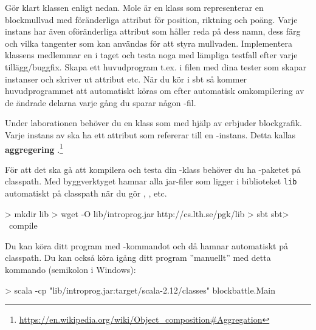 \Subtask Gör klart klassen  enligt nedan. Mole är en klass som representerar en blockmullvad med föränderliga attribut för position, riktning och poäng. Varje instans har även oföränderliga attribut som håller reda på dess namn, dess färg och vilka tangenter som kan användas för att styra mullvaden. Implementera klassens medlemmar en i taget och testa noga med lämpliga testfall efter varje tillägg/buggfix. Skapa ett huvudprogram t.ex. i filen  med dina tester som skapar instanser och skriver ut attribut etc. När du kör  i sbt så kommer huvudprogrammet att automatiskt köras om efter automatisk omkompilering av de ändrade delarna varje gång du sparar någon -fil.
%
%
%
%
%



\Subtask Under laborationen behöver du en klass  som med hjälp av  erbjuder blockgrafik. Varje instans av  ska ha ett attribut som refererar till en -instans. Detta kallas \textbf{aggregering} .\footnote{\url{https://en.wikipedia.org/wiki/Object\_composition\#Aggregation}}

För att det ska gå att kompilera och testa din -klass behöver du ha -paketet på classpath. Med byggverktyget  hamnar alla jar-filer som ligger i biblioteket \texttt{lib} automatiskt på classpath när du gör , , etc.

\begin{REPLnonum}
> mkdir lib
> wget -O lib/introprog.jar http://cs.lth.se/pgk/lib
> sbt
sbt> ~compile
\end{REPLnonum}
Du kan köra ditt program med -kommandot  och då hamnar  automatiskt på classpath. Du kan också köra igång ditt program ''manuellt'' med detta kommando (semikolon i Windows):
\begin{REPLnonum}
> scala -cp "lib/introprog.jar:target/scala-2.12/classes" blockbattle.Main
\end{REPLnonum}

